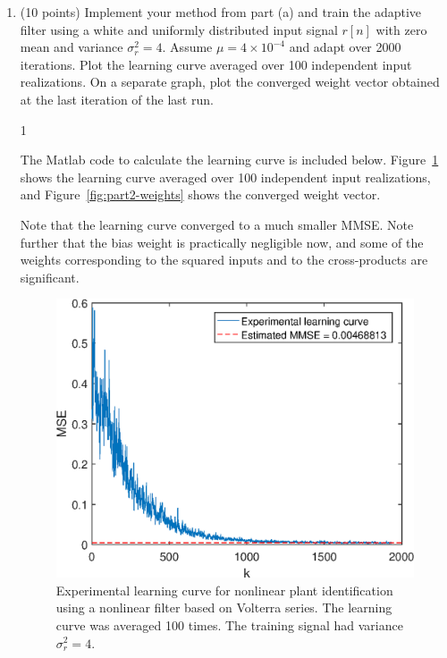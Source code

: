 \documentclass[10pt]{article}
\def\SOLUTIONS{0} %
\def\SolutionsColor{red2}
\begin{document}
\begin{enumerate}[label=(\alph*)]
	\item (10 points) Implement your method from part (a) and train the adaptive filter using a white and uniformly distributed input signal $r[n]$ with zero mean and variance $\sigma_r^2 = 4$. Assume $\mu = 4\times 10^{-4}$ and adapt over 2000 iterations. Plot the learning curve averaged over 100 independent input realizations. On a separate graph, plot the converged weight vector obtained at the last iteration of the last  run. 
	
	\if\SOLUTIONS1 {\color{\SolutionsColor}
		The Matlab code to calculate the learning curve is included below. Figure~\ref{fig:part2-learning-curve} shows the learning curve averaged over 100 independent input realizations, and  Figure~\ref{fig:part2-weights} shows the converged weight vector. 
		
		Note that the learning curve converged to a much smaller MMSE. Note further that the bias weight is practically negligible now, and some of the weights corresponding to the squared inputs and to the cross-products are significant. 
		
		\FloatBarrier
		\begin{figure}[h!]
			\centering
			\includegraphics[scale=0.8]{figs/part2_learning_curve.eps}
			\caption{Experimental learning curve for nonlinear plant identification using a nonlinear filter based on Volterra series. The learning curve was averaged 100 times. The training signal had variance $\sigma_r^2 = 4$.}
			\label{fig:part2-learning-curve}
		\end{figure}
		\FloatBarrier
		
}
\end{enumerate}
\end{document}

